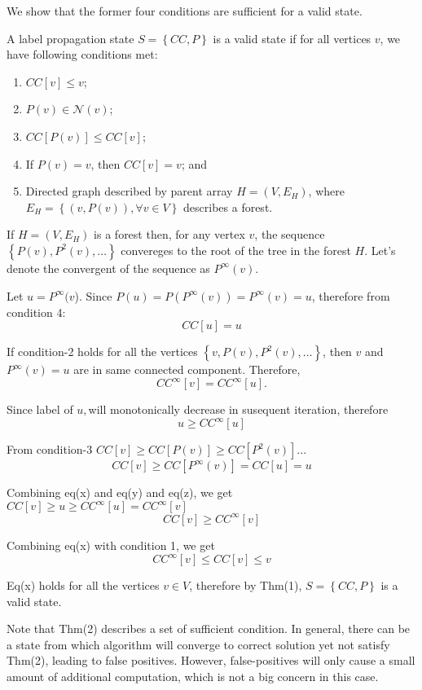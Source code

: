 We show that the former four conditions are sufficient for a valid
state. 
\begin{thm}
A label propagation state $S=\left\{ CC,P\right\} $ is a valid state
if for all vertices $v$, we have following conditions met:
\end{thm}
\begin{enumerate}
\item $CC[v]\leq v$;
\item $P(v)\in\mathcal{N}(v)$;
\item $CC[P(v)]\leq CC[v]$; 
\item If $P(v)=v$, then $CC[v]=v$; and 
\item Directed graph described by parent array $H=(V,E_{H})$, where $E_{H}=\left\{ (v,P(v)),\forall v\in V\right\} $
describes a forest.
\end{enumerate}
\begin{IEEEproof}
If $H=\left(V,E_{H}\right)$ is a forest then, for any vertex $v$,
the sequence $\left\{ P(v),P^{2}(v),\ldots\right\} $ convereges to
the root of the tree in the forest $H$. Let's denote the convergent
of the sequence as $P^{\infty}(v)$. 

Let $u=P^{\infty}(v$). Since $P(u)=P(P^{\infty}(v))=P^{\infty}(v)=u$,
therefore from condition 4:
\begin{equation}
CC[u]=u
\end{equation}

If condition-2 holds for all the vertices $\left\{ v,P(v),P^{2}(v),\ldots\right\} $,
then $v$ and $P^{\infty}(v)=u$ are in same connected component.
Therefore,
\begin{equation}
CC^{\infty}[v]=CC^{\infty}[u].
\end{equation}

Since label of $u,$will monotonically decrease in susequent iteration,
therefore 
\begin{equation}
u\ge CC^{\infty}[u]
\end{equation}

From condition-3 $CC[v]\geq CC[P(v)]\geq CC[P^{2}(v)]...$
\begin{equation}
CC[v]\geq CC[P^{\infty}(v)]=CC[u]=u
\end{equation}

Combining eq(x) and eq(y) and eq(z), we get $CC[v]\ge u\geq CC^{\infty}[u]=CC^{\infty}[v]$
\begin{equation}
CC[v]\geq CC^{\infty}[v]
\end{equation}

Combining eq(x) with condition 1, we get 
\[
CC^{\infty}[v]\le CC[v]\le v
\]

Eq(x) holds for all the vertices $v\in V$, therefore by Thm(1), $S=\left\{ CC,P\right\} $
is a valid state.
\end{IEEEproof}
%
Note that Thm(2) describes a set of sufficient condition. In general,
there can be a state from which algorithm will converge to correct
solution yet not satisfy Thm(2), leading to false positives. However,
false-positives will only cause a small amount of additional computation,
which is not a big concern in this case. 

